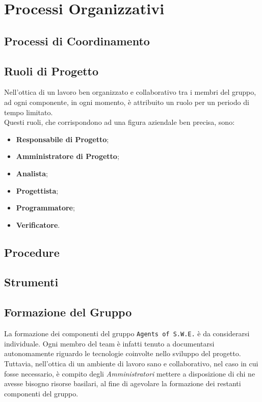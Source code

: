 \section{Processi Organizzativi}

\subsection{Processi di Coordinamento}


\subsection{Ruoli di Progetto}
	Nell'ottica di un lavoro ben organizzato e collaborativo tra i membri del gruppo, ad ogni componente, in ogni 					momento, è attribuito un ruolo per un periodo di tempo limitato.\\
	Questi ruoli, che corrispondono ad una figura aziendale ben precisa, sono:
	\begin{itemize}
	\item \textbf{Responsabile di Progetto};
	\item \textbf{Amministratore di Progetto};
	\item \textbf{Analista};
	\item \textbf{Progettista};
	\item \textbf{Programmatore};
	\item \textbf{Verificatore}.
	\end{itemize}
	

\subsection{Procedure}


\subsection{Strumenti}


\subsection{Formazione del Gruppo}
	La formazione dei componenti del gruppo \texttt{Agents of S.W.E.} è da considerarsi individuale. Ogni membro del 			team è infatti tenuto a documentarsi autonomamente riguardo le tecnologie coinvolte nello sviluppo del 								progetto\glossario. Tuttavia, nell'ottica di un ambiente di lavoro sano e collaborativo, nel caso in cui fosse 				necessario, è compito degli \textit{Amministratori} mettere a disposizione di chi ne avesse bisogno risorse 						basilari, al fine di	agevolare la formazione dei restanti componenti del gruppo.
